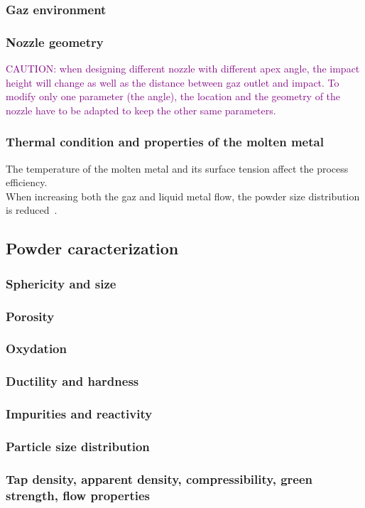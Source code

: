 \subsubsection{Gaz environment}
\label{s:gaz_env}


\subsubsection{Nozzle geometry}

\textcolor{Purple}{CAUTION: when designing different nozzle with different apex angle, the impact height will change as well as the distance between gaz outlet and impact. To modify only one parameter (the angle), the location and the geometry of the nozzle have to be adapted to keep the other same parameters.}


\subsubsection{Thermal condition and properties of the molten metal}

The temperature of the molten metal and its surface tension affect the process efficiency.\\
When increasing both the gaz and liquid metal flow, the powder size distribution is reduced~\cite{Kassym2020Atomizationprocesses}.


\subsection{Powder caracterization}

\subsubsection{Sphericity and size}
\subsubsection{Porosity}
\subsubsection{Oxydation}
\subsubsection{Ductility and hardness}
\subsubsection{Impurities and reactivity}
\subsubsection{Particle size distribution}
\subsubsection{Tap density, apparent density, compressibility, green strength, flow properties}
